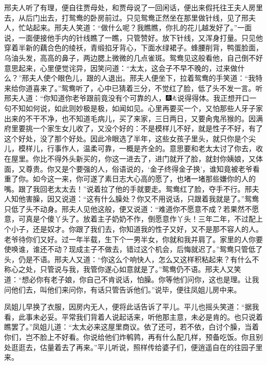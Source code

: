 邢夫人听了有理，便自往贾母处，和贾母说了一回闲话，便出来假托往王夫人房里去，从后门出去，打鸳鸯的卧房前过。只见鸳鸯正然坐在那里做针线，见了邢夫人，忙站起来。邢夫人笑道：``做什么呢？我瞧瞧，你扎的花儿越发好了。''一面说，一面便接他手内的针线瞧了一瞧，只管赞好。放下针线，又浑身打量。只见他穿着半新的藕合色的绫袄，青缎掐牙背心，下面水绿裙子。蜂腰削背，鸭蛋脸面，乌油头发，高高的鼻子，两边腮上微微的几点雀斑。鸳鸯见这般看他，自己倒不好意思起来，心里便觉诧异，因笑问道：``太太，这会子不早不晚的，过来做什么？''邢夫人使个眼色儿，跟的人退出。邢夫人便坐下，拉着鸳鸯的手笑道：``我特来给你道喜来了。''鸳鸯听了，心中已猜着三分，不觉红了脸，低了头不发一言。听邢夫人道：``你知道你老爷跟前竟没有个可靠的人，{\includegraphics[width=3mm]{../Images/00004}\includegraphics[width=3mm]{../Images/00012}\footnotesize \kaishu 说得得体。我正想开口一句不知如何说，如此则妙极是极，如闻如见。}心里再要买一个，又怕那些人牙子家出来的不干不净，也不知道毛病儿，买了来家，三日两日，又要肏鬼吊猴的。因满府里要挑一个家生女儿收了，又没个好的：不是模样儿不好，就是性子不好，有了这个好处，没了那个好处。因此冷眼选了半年，这些女孩子里头，就只你是个尖儿，模样儿，行事作人，温柔可靠，一概是齐全的。意思要和老太太讨了你去，收在屋里。你比不得外头新买的，你这一进去了，进门就开了脸，就封你姨娘，又体面，又尊贵。你又是个要强的人，俗语说的，`金子终得金子换'，谁知竟被老爷看重了你。如今这一来，你可遂了素日志大心高的愿了，也堵一堵那些嫌你的人的嘴。跟了我回老太太去！''说着拉了他的手就要走。鸳鸯红了脸，夺手不行。邢夫人知他害臊，因又说道：``这有什么臊处？你又不用说话，只跟着我就是了。''鸳鸯只低了头不动身。邢夫人见他这般，便又说道：``难道你不愿意不成？若果然不愿意，可真是个傻丫头了。放着主子奶奶不作，倒愿意作丫头！三年二年，不过配上个小子，还是奴才。你跟了我们去，你知道我的性子又好，又不是那不容人的人。老爷待你们又好。过一年半载，生下个一男半女，你就和我并肩了。家里的人你要使唤谁，谁还不动？现成主子不做去，错过这个机会，后悔就迟了。''鸳鸯只管低了头，仍是不语。邢夫人又道：``你这么个响快人，怎么又这样积粘起来？有什么不称心之处，只管说与我，我管你遂心如意就是了。''鸳鸯仍不语。邢夫人又笑道：``想必你有老子娘，你自己不肯说话，怕臊。你等他们问你，这也是理。让我问他们去，叫他们来问你，有话只管告诉他们。''说毕，便往凤姐儿房中来。

凤姐儿早换了衣服，因房内无人，便将此话告诉了平儿。平儿也摇头笑道：``据我看，此事未必妥。平常我们背着人说起话来，听他那主意，未必是肯的。也只说着瞧罢了。''凤姐儿道：``太太必来这屋里商议。依了还可，若不依，白讨个臊，当着你们，岂不脸上不好看。你说给他们炸鹌鹑，再有什么配几样，预备吃饭。你且别处逛逛去，估量着去了再来。''平儿听说，照样传给婆子们，便逍遥自在的往园子里来。

